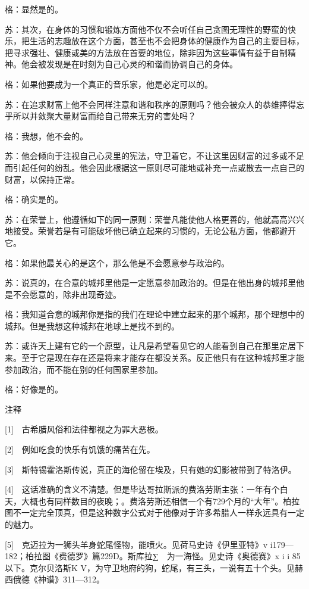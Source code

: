 \documentclass[12pt,oneside]{book}
\begin{document}
格：显然是的。

苏：其次，在身体的习惯和锻炼方面他不仅不会听任自己贪图无理性的野蛮的快乐，把生活的志趣放在这个方面，甚至也不会把身体的健康作为自己的主要目标，把寻求强壮、健康或美的方法放在首要的地位，除非因为这些事情有益于自制精神。他会被发现是在时刻为自己心灵的和谐而协调自己的身体。

格：如果他要成为一个真正的音乐家，他是必定可以的。

苏：在追求财富上他不会同样注意和谐和秩序的原则吗？他会被众人的恭维捧得忘乎所以并敛聚大量财富而给自己带来无穷的害处吗？

格：我想，他不会的。

苏：他会倾向于注视自己心灵里的宪法，守卫着它，不让这里因财富的过多或不足而引起任何的纷乱。他会因此根据这一原则尽可能地或补充一点或散去一点自己的财富，以保持正常。

格：确实是的。

苏：在荣誉上，他遵循如下的同一原则：荣誉凡能使他人格更善的，他就高高兴兴地接受。荣誉若是有可能破坏他已确立起来的习惯的，无论公私方面，他都避开它。

格：如果他最关心的是这个，那么他是不会愿意参与政治的。

苏：说真的，在合意的城邦里他是一定愿意参加政治的。但是在他出身的城邦里他是不会愿意的，除非出现奇迹。

格：我知道合意的城邦你是指的我们在理论中建立起来的那个城邦，那个理想中的城邦。但是我想这种城邦在地球上是找不到的。

苏：或许天上建有它的一个原型，让凡是希望看见它的人能看到自己在那里定居下来。至于它是现在存在还是将来才能存在都没关系。反正他只有在这种城邦里才能参加政治，而不能在别的任何国家里参加。

格：好像是的。

注释

[1]　古希腊风俗和法律都视之为罪大恶极。

[2]　例如吃食的快乐有饥饿的痛苦在先。

[3]　斯特锡霍洛斯传说，真正的海伦留在埃及，只有她的幻影被带到了特洛伊。

[4]　这话准确的含义不清楚。但是毕达哥拉斯派的费洛劳斯主张：一年有个白天，大概也有同样数目的夜晚；。费洛劳斯还相信一个有729个月的“大年”。柏拉图不一定完全顶真，但是这种数字公式对于他像对于许多希腊人一样永远具有一定的魅力。

[5]　克迈拉为一狮头羊身蛇尾怪物，能喷火。见荷马史诗《伊里亚特》v i179—182；柏拉图《费德罗》篇229D。斯库拉∑　为一海怪。见史诗《奥德赛》x i i 85以下。克尔贝洛斯K V，为守卫地府的狗，蛇尾，有三头，一说有五十个头。见赫西俄德《神谱》311—312。
\end{document}
